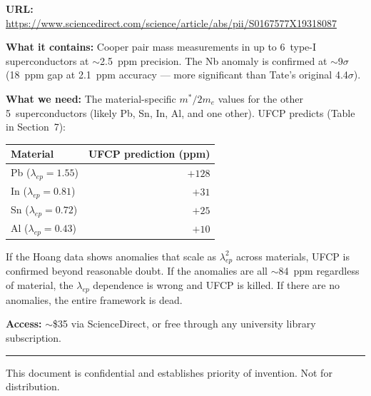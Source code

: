 \documentclass[11pt, a4paper]{article}
\begin{document}
\textbf{URL:} \url{https://www.sciencedirect.com/science/article/abs/pii/S0167577X19318087}

\textbf{What it contains:} Cooper pair mass measurements in up
to 6~type-I superconductors at $\sim$2.5~ppm precision. The Nb
anomaly is confirmed at $\sim$9$\sigma$ (18~ppm gap at 2.1~ppm
accuracy --- more significant than Tate's original 4.4$\sigma$).

\textbf{What we need:} The material-specific $m^*/2m_e$ values
for the other 5~superconductors (likely Pb, Sn, In, Al, and one
other). UFCP predicts (Table in Section~7):
\begin{center}
\begin{tabular}{@{}lr@{}}
\toprule
\textbf{Material} & \textbf{UFCP prediction (ppm)} \\
\midrule
Pb ($\lambda_{ep} = 1.55$) & $+128$ \\
In ($\lambda_{ep} = 0.81$) & $+31$ \\
Sn ($\lambda_{ep} = 0.72$) & $+25$ \\
Al ($\lambda_{ep} = 0.43$) & $+10$ \\
\bottomrule
\end{tabular}
\end{center}

If the Hoang data shows anomalies that scale as $\lambda_{ep}^2$
across materials, UFCP is confirmed beyond reasonable doubt. If
the anomalies are all $\sim$84~ppm regardless of material, the
$\lambda_{ep}$ dependence is wrong and UFCP is killed. If there
are no anomalies, the entire framework is dead.

\textbf{Access:} $\sim$\$35 via ScienceDirect, or free through
any university library subscription.

\vspace{2em}
\hrule
\vspace{0.5em}
{\color{nm-gray}\small This document is confidential and
establishes priority of invention. Not for distribution.}
\end{document}
